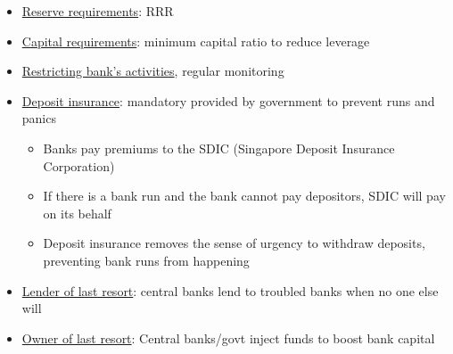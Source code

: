\documentclass{article}
\begin{document}
\begin{multicols}{2}
\begin{itemize}
	\item \underline{Reserve requirements}: RRR
	\item \underline{Capital requirements}: minimum capital ratio to reduce leverage
	\item \underline{Restricting bank's activities}, regular monitoring
	\item \underline{Deposit insurance}: mandatory provided by government to prevent runs and panics
	\begin{itemize}
		\item Banks pay premiums to the SDIC (Singapore Deposit Insurance Corporation)
		\item If there is a bank run and the bank cannot pay depositors, SDIC will pay on its behalf
		\item Deposit insurance removes the sense of urgency to withdraw deposits, preventing bank runs from happening
	\end{itemize}
    \item \underline{Lender of last resort}: central banks lend to troubled banks when no one else will
    \item \underline{Owner of last resort}: Central banks/govt inject funds to boost bank capital
\end{itemize}
\end{multicols}
\end{document}
